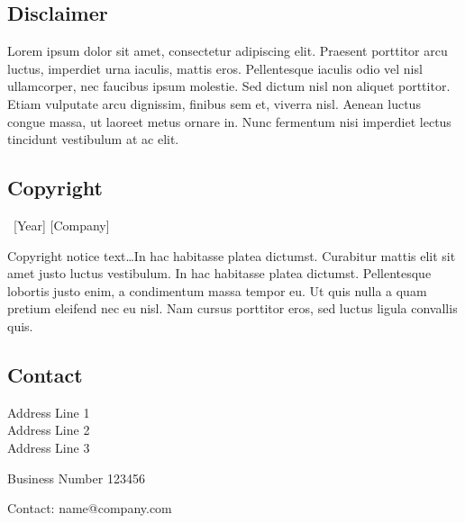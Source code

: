 \documentclass[a4paper]{CSMakotoTechnicalReport}
\begin{document}

\vfill %

\begingroup
\footnotesize %

\subsection*{Disclaimer}

Lorem ipsum dolor sit amet, consectetur adipiscing elit. Praesent porttitor arcu luctus, imperdiet urna iaculis, mattis eros. Pellentesque iaculis odio vel nisl ullamcorper, nec faucibus ipsum molestie. Sed dictum nisl non aliquet porttitor. Etiam vulputate arcu dignissim, finibus sem et, viverra nisl. Aenean luctus congue massa, ut laoreet metus ornare in. Nunc fermentum nisi imperdiet lectus tincidunt vestibulum at ac elit.

\subsection*{Copyright}

\textcopyright~[Year] [Company] 

Copyright notice text\ldots In hac habitasse platea dictumst. Curabitur mattis elit sit amet justo luctus vestibulum. In hac habitasse platea dictumst. Pellentesque lobortis justo enim, a condimentum massa tempor eu. Ut quis nulla a quam pretium eleifend nec eu nisl. Nam cursus porttitor eros, sed luctus ligula convallis quis.

\subsection*{Contact}

Address Line 1\\
Address Line 2\\
Address Line 3

Business Number 123456

Contact: name@company.com
\endgroup


\newpage
\end{document}
